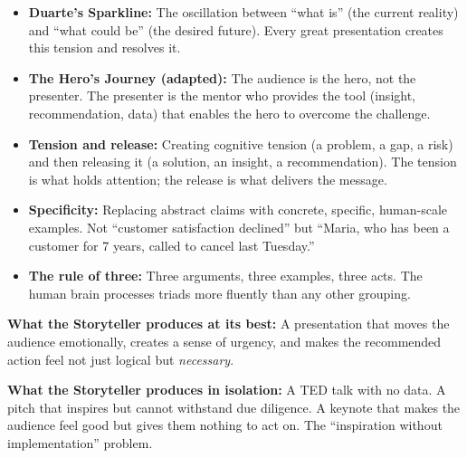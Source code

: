 \begin{itemize}
  \item \textbf{Duarte's Sparkline:} The oscillation between ``what is'' (the current reality) and ``what could be'' (the desired future). Every great presentation creates this tension and resolves it.
  \item \textbf{The Hero's Journey (adapted):} The audience is the hero, not the presenter. The presenter is the mentor who provides the tool (insight, recommendation, data) that enables the hero to overcome the challenge.
  \item \textbf{Tension and release:} Creating cognitive tension (a problem, a gap, a risk) and then releasing it (a solution, an insight, a recommendation). The tension is what holds attention; the release is what delivers the message.
  \item \textbf{Specificity:} Replacing abstract claims with concrete, specific, human-scale examples. Not ``customer satisfaction declined'' but ``Maria, who has been a customer for 7 years, called to cancel last Tuesday.''
  \item \textbf{The rule of three:} Three arguments, three examples, three acts. The human brain processes triads more fluently than any other grouping.
\end{itemize}

\textbf{What the Storyteller produces at its best:} A presentation that moves the audience emotionally, creates a sense of urgency, and makes the recommended action feel not just logical but \emph{necessary}.

\textbf{What the Storyteller produces in isolation:} A TED talk with no data. A pitch that inspires but cannot withstand due diligence. A keynote that makes the audience feel good but gives them nothing to act on. The ``inspiration without implementation'' problem.

